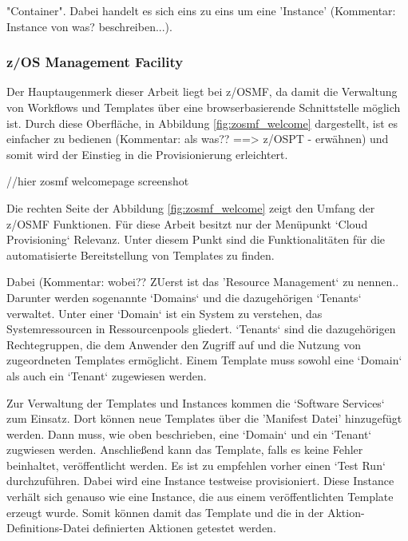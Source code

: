 "Container".
Dabei handelt es sich eins zu eins um eine 'Instance' (Kommentar: Instance von was? beschreiben...).
\cite{IBM.2019b}

\subsubsection{z/OS Management Facility}\label{sssec:zosmf}
Der Hauptaugenmerk dieser Arbeit liegt  bei z/OSMF, da damit die Verwaltung von Workflows und Templates über eine browserbasierende Schnittstelle möglich ist.
Durch diese Oberfläche, in Abbildung \ref{fig:zosmf_welcome} dargestellt, ist es einfacher zu bedienen (Kommentar: als was?? ==> z/OSPT - erwähnen)  und somit wird der Einstieg in die Provisionierung erleichtert.

//hier zosmf welcomepage screenshot

Die rechten Seite der Abbildung \ref{fig:zosmf_welcome} zeigt den Umfang der z/OSMF  Funktionen.
Für diese Arbeit besitzt nur der Menüpunkt `Cloud Provisioning` Relevanz.
Unter diesem Punkt sind die Funktionalitäten für die automatisierte Bereitstellung von Templates zu finden.
\cite{Rotthove.2018}

Dabei (Kommentar: wobei?? ZUerst ist das 'Resource Management` zu nennen..
Darunter werden sogenannte `Domains` und die dazugehörigen `Tenants` verwaltet.
Unter einer `Domain` ist ein System zu verstehen, das Systemressourcen in Ressourcenpools gliedert.
`Tenants` sind die dazugehörigen Rechtegruppen, die dem Anwender den Zugriff auf und die Nutzung von zugeordneten Templates ermöglicht.
Einem Template muss sowohl eine `Domain` als auch ein `Tenant` zugewiesen werden.
\cite{Rotthove.2018}

Zur Verwaltung der Templates und Instances kommen die `Software Services` zum Einsatz.
Dort können neue Templates über die 'Manifest Datei' hinzugefügt werden.
Dann muss, wie oben beschrieben, eine `Domain` und ein `Tenant` zugwiesen werden.
Anschließend kann das Template, falls es keine Fehler beinhaltet, veröffentlicht werden.
Es ist zu empfehlen vorher einen `Test Run` durchzuführen.
Dabei wird eine Instance testweise provisioniert.
Diese Instance verhält sich genauso wie eine Instance, die aus einem veröffentlichten Template erzeugt wurde.
Somit können damit das Template und die in der Aktion-Definitions-Datei definierten Aktionen getestet werden.
\cite{Rotthove.2018}
